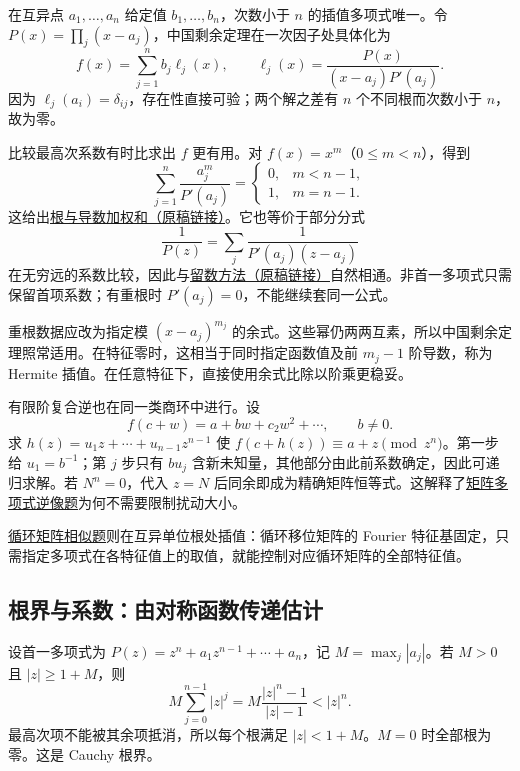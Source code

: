 \documentclass[UTF8,12pt,a4paper,fontset=fandol]{ctexart}
\begin{document}
\label{app:algebra-interpolation}

在互异点 $a_1,\ldots,a_n$ 给定值 $b_1,\ldots,b_n$，次数小于 $n$ 的插值多项式唯一。令 $P(x)=\prod_j(x-a_j)$，中国剩余定理在一次因子处具体化为
\[
f(x)=\sum_{j=1}^nb_j\ell_j(x),\qquad
\ell_j(x)=\frac{P(x)}{(x-a_j)P'(a_j)}.
\]
因为 $\ell_j(a_i)=\delta_{ij}$，存在性直接可验；两个解之差有 $n$ 个不同根而次数小于 $n$，故为零。

比较最高次系数有时比求出 $f$ 更有用。对 $f(x)=x^m$（$0\le m<n$），得到
\[
\sum_{j=1}^n\frac{a_j^m}{P'(a_j)}
=\begin{cases}0,&m<n-1,\\1,&m=n-1.\end{cases}
\]
这给出\href{https://github.com/lzxcr/cmc-mathematics/blob/64916fa1fdbc3e444a652eca204d5669058ee321/src/problems/finals/15/11.md}{根与导数加权和（原稿链接）}。它也等价于部分分式
\[
\frac1{P(z)}=\sum_j\frac1{P'(a_j)(z-a_j)}
\]
在无穷远的系数比较，因此与\href{https://github.com/lzxcr/cmc-mathematics/blob/64916fa1fdbc3e444a652eca204d5669058ee321/src/methods/inner/08-complex.md}{留数方法（原稿链接）}自然相通。非首一多项式只需保留首项系数；有重根时 $P'(a_j)=0$，不能继续套同一公式。

重根数据应改为指定模 $(x-a_j)^{m_j}$ 的余式。这些幂仍两两互素，所以中国剩余定理照常适用。在特征零时，这相当于同时指定函数值及前 $m_j-1$ 阶导数，称为 Hermite 插值。在任意特征下，直接使用余式比除以阶乘更稳妥。

有限阶复合逆也在同一类商环中进行。设
\[
f(c+w)=a+bw+c_2w^2+\cdots,\qquad b\ne0.
\]
求 $h(z)=u_1z+\cdots+u_{n-1}z^{n-1}$ 使 $f(c+h(z))\equiv a+z\pmod{z^n}$。第一步给 $u_1=b^{-1}$；第 $j$ 步只有 $bu_j$ 含新未知量，其他部分由此前系数确定，因此可递归求解。若 $N^n=0$，代入 $z=N$ 后同余即成为精确矩阵恒等式。这解释了\hyperref[pr:fin14-high:6]{矩阵多项式逆像题}为何不需要限制扰动大小。

\hyperref[pr:fin14-low:8]{循环矩阵相似题}则在互异单位根处插值：循环移位矩阵的 Fourier 特征基固定，只需指定多项式在各特征值上的取值，就能控制对应循环矩阵的全部特征值。

\subsection{根界与系数：由对称函数传递估计}

\label{app:algebra-roots}

设首一多项式为 $P(z)=z^n+a_1z^{n-1}+\cdots+a_n$，记 $M=\max_j|a_j|$。若 $M>0$ 且 $|z|\ge1+M$，则
\[
M\sum_{j=0}^{n-1}|z|^j
=M\frac{|z|^n-1}{|z|-1}<|z|^n.
\]
最高次项不能被其余项抵消，所以每个根满足 $|z|<1+M$。$M=0$ 时全部根为零。这是 Cauchy 根界。
\end{document}
